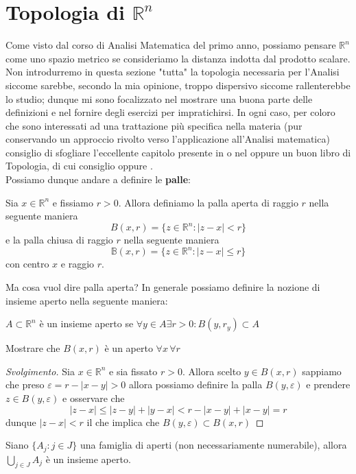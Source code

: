 \section{Topologia di $\mathbb{R}^n$}
Come visto dal corso di Analisi Matematica del primo anno, possiamo pensare $\mathbb{R}^n$ come uno spazio metrico se consideriamo la distanza indotta dal prodotto scalare. Non introdurremo in questa sezione "tutta" la topologia necessaria per l'Analisi siccome sarebbe, secondo la mia opinione, troppo dispersivo siccome rallenterebbe lo studio; dunque mi sono focalizzato nel mostrare una buona parte delle definizioni e nel fornire degli esercizi per impratichirsi. In ogni caso, per coloro che sono interessati
ad una trattazione più specifica nella materia (pur conservando un approccio rivolto verso l'applicazione all'Analisi matematica) consiglio di sfogliare l'eccellente capitolo presente in \cite{rudin} o nel \cite{ambrosio} oppure un buon libro di Topologia, di cui consiglio \cite{manetti} oppure \cite{munkres}. \\
Possiamo dunque andare a definire le \textbf{palle}:
\begin{definition}
Sia $x \in \mathbb{R}^n$ e fissiamo $r > 0$. Allora definiamo la palla aperta di raggio $r$ nella seguente maniera
$$
B(x, r) = \{ z \in \mathbb{R}^n: |z-x| < r \}
$$
e la palla chiusa di raggio $r$ nella seguente maniera
$$
\mathbb{B}(x, r) = \{ z \in \mathbb{R}^n: |z - x| \leq r \}
$$
con centro $x$ e raggio $r$.
\end{definition}
\noindent Ma cosa vuol dire palla aperta? In generale possiamo definire la nozione di insieme aperto nella seguente maniera:
\begin{definition}
$A \subset \mathbb{R}^n$ è un insieme aperto se $\forall y \in A \exists r > 0: B(y, r_y) \subset A$
\end{definition}
\begin{exercise}
Mostrare che $B(x, r)$ è un aperto $\forall x \, \forall r$
\end{exercise}
\begin{proof}[Svolgimento]
Sia $x \in \mathbb{R}^n$ e sia fissato $r > 0$. Allora scelto $y \in B(x, r)$ sappiamo che preso $\varepsilon = r - |x - y| > 0$ allora 
possiamo definire la palla $B(y, \varepsilon)$ e prendere $z \in B(y, \varepsilon)$ e osservare che
$$
|z-x| \leq |z-y| + |y-x| < r - |x-y| + |x-y| = r
$$
dunque $|z-x| < r$ il che implica che $B(y, \varepsilon) \subset B(x, r)$
\end{proof}
\begin{exercise}
Siano $\{A_j: j \in J \}$ una famiglia di aperti (non necessariamente numerabile), allora $\bigcup\limits_{j \in J} A_j$ è un insieme aperto.
\label{exercise:union_open_set_is_open}
\end{exercise}

